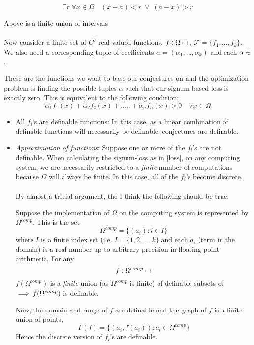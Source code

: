 \begin{equation*}
    \exists r\;\forall x\in\Omega \quad (x - a) < r\; \vee \; (a - x) > r
\end{equation*}

Above is a finite union of intervals
\\\\
Now consider a  finite set of $C^0$ real-valued functions, $f:\Omega\mapsto\real$, $\mathcal{F} = \{f_1,...,f_k\}$. We also need a corresponding tuple of coefficients $\alpha = (\alpha_1,...,\alpha_k)$ and each $\alpha\in\real$.

These are the functions we want to base our conjectures on and the optimization problem is finding the possible tuples $\alpha$ such that our signum-based loss is exactly zero. This is equivalent to the following condition:
\begin{equation}
\label{loss}
    \alpha_1f_1(x)+\alpha_2f_2(x)+.....+\alpha_nf_n(x) > 0 \quad\forall x\in\Omega
\end{equation}

\begin{itemize}
    \item All $f_i$'s are definable functions: In this case, as a linear combination of definable functions will necessarily be definable, conjectures are definable.
    \item \textit{Approximation of functions}: Suppose one or more of the $f_i$'s are not definable. When calculating the signum-loss as in \ref{loss}, on any computing system, we are necessarily restricted to a \textit{finite} number of computations because $\Omega$ will always be finite. In this case, all of the $f_i$'s become discrete.
    \\\\ By almost a trivial argument, the I think the following should be true:

    Suppose the implementation of $\Omega$ on the computing system is represented by $\Omega^{comp}$. This is the set
    \begin{equation*}
        \Omega^{comp} = \{(a_i) : i\in I\} 
    \end{equation*}
    where $I$ is a finite index set (i.e. $I = \{1, 2, ..., k\}$ and each $a_i$ (term in the domain) is a real number up to arbitrary precision in floating point arithmetic.
    For any
    \begin{equation*}
        f:\Omega^{comp}\mapsto\real
    \end{equation*}
    $f(\Omega^{comp})$ is a \textit{finite} union (as $\Omega^{comp}$ is finite) of definable subsets of $\real\implies f(\Omega^{comp})$ is definable.
    \par Now, the domain and range of $f$ are definable and the graph of $f$ is a finite union of points,
    \begin{equation*}
        \Gamma(f) = \{(a_i, f(a_i)): a_i\in\Omega^{comp}\}
    \end{equation*}
    Hence the discrete version of $f_i$'s are definable.
\end{itemize}

